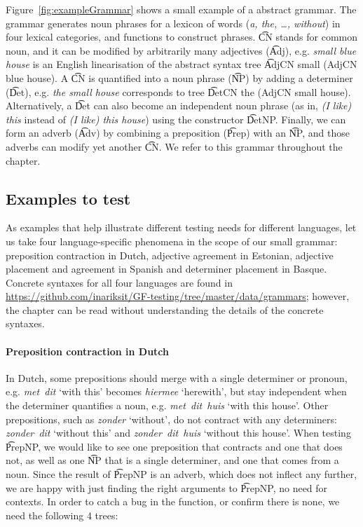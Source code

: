 Figure~\ref{fig:exampleGrammar} shows a small example of a \gf{}
abstract grammar. The grammar generates noun phrases for a lexicon of
\numOfLex{} words (\emph{a, the, \dots, without}) in four lexical
categories, and \numOfFun{} functions to construct phrases. \t{CN} stands
for common noun, and it can be modified by arbitrarily many adjectives
(\t{Adj}), e.g. \emph{small blue house} is an English linearisation of
the abstract syntax tree \t{AdjCN small (AdjCN blue house)}. A \t{CN}
is quantified into a noun phrase (\t{NP}) by adding a determiner
(\t{Det}), e.g. \emph{the small house} corresponds to tree \t{DetCN
  the (AdjCN small house)}. Alternatively, a \t{Det} can also become
an independent noun phrase (as in, \emph{(I like) this} instead of
\emph{(I like) this house}) using the constructor \t{DetNP}. Finally,
we can form an adverb (\t{Adv}) by combining a preposition (\t{Prep})
with an \t{NP}, and those adverbs can modify yet another \t{CN}.  We
refer to this grammar throughout the chapter.

\subsection{Examples to test}
\label{gf-testing-examples}

As examples that help illustrate different testing needs for different
languages, let us take four language-specific phenomena in the scope
of our small grammar: preposition contraction in Dutch, adjective
agreement in Estonian, adjective placement and agreement in Spanish
and determiner placement in Basque. Concrete syntaxes for all four
languages are found in
\url{https://github.com/inariksit/GF-testing/tree/master/data/grammars};
however, the chapter can be read without understanding the details of
the concrete syntaxes.

\paragraph{Preposition contraction in Dutch} In Dutch, some prepositions should
merge with a single determiner or pronoun, e.g. \emph{met~dit} `with
this' becomes \emph{hiermee} `herewith', but stay independent when the
determiner quantifies a noun, e.g. \emph{met~dit~huis} `with this house'. 
Other prepositions, such as \emph{zonder} `without', do not
contract with any determiners: \emph{zonder~dit} `without this' and
\emph{zonder~dit~huis} `without this house'.
When testing \t{PrepNP}, we would like to see one preposition that
contracts and one that does not, as well as one \t{NP} that is a
single determiner, and one that comes from a noun. Since the result of
\t{PrepNP} is an adverb, which does not inflect any further, we are
happy with just finding the right arguments to \t{PrepNP}, no need for contexts.
In order to catch a bug in the function, or confirm there is none, we
need the following 4 trees: 

